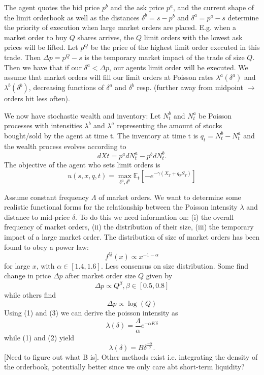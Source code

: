 The agent quotes the bid price $p^b$ and the ask price $p^a$, and the current shape of the limit orderbook as well as the distances $\delta^b=s-p^b$ and $\delta^a=p^a-s$ determine the priority of execution when large market orders are placed. 
E.g. when a market order to buy $Q$ shares arrives, the $Q$ limit orders with the lowest ask prices will be lifted. 
Let $p^Q$ be the price of the highest limit order executed in this trade. Then $\Delta p=p^Q-s$ is the temporary market impact of the trade of size $Q.$ 
Then we have that if our $\delta^a < \Delta p$, our agents limit order will be executed. We assume that market orders will fill our limit orders at Poisson rates $\lambda^a(\delta^a)$ and $\lambda^b(\delta^b)$, decreasing functions of $\delta^a$ and $\delta^b$ resp. 
(further away from midpoint $\rightarrow$ orders hit less often).

We now have stochastic wealth and inventory: Let $N^b_t$ and $N^a_t$ be Poisson processes with intensities $\lambda^b$ and $\lambda^a$ representing the amount of stocks bought/sold by the agent at time t. The inventory at time t is $q_t=N^b_t-N^a_t$ and the wealth process evolves according to
$$dXt=p^adN^a_t-p^bdN^b_t.$$
The objective of the agent who sets limit orders is 
$$u(s,x,q,t)=\max\limits_{\delta^a,\delta^b}\mathbb{E}_t\left[-e^{-\gamma(X_T+q_TS_T)}\right]$$

Assume constant frequency $\Lambda$ of market orders. We want to determine some realistic functional forms for the relationship between the Poisson intensity $\lambda$ and distance to mid-price $\delta$. 
To do this we need information on: (i) the overall frequency of market orders, (ii) the distribution of their size, (iii) the temporary impact of a large market order. The distribution of size of market orders has been found to obey a power law:
\begin{equation}
    f^{Q}(x)\propto x^{-1-\alpha}
\end{equation}
for large $x$, with $\alpha\in[1.4,1.6].$
Less consensus on size distribution. Some find change in price $\Delta p$ after market order size $Q$ given by 
\begin{equation}
    \Delta p\propto Q^\beta, \beta\in[0.5,0.8]
\end{equation}
while others find
\begin{equation}
    \Delta p\propto\log(Q)
\end{equation}
Using (1) and (3) we can derive the poisson intensity as
$$\lambda(\delta)=\frac{\Lambda}{\alpha}e^{-\alpha K\delta}$$
while (1) and (2) yield
$$\lambda(\delta)=B\delta^{\frac{-\alpha}{\beta}}.$$
[Need to figure out what B is]. Other methods exist i.e. integrating the density of the orderbook, potentially better since we only care abt short-term liquidity?

